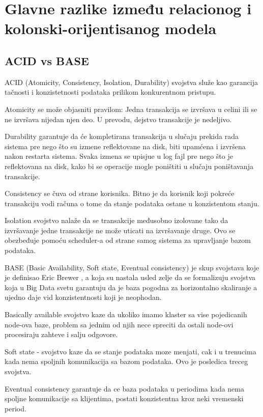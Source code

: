 \documentclass[12pt,oneside]{memoir}
\begin{document}
\pagebreak

\section{Glavne razlike između relacionog i kolonski-orijentisanog modela}

\subsection{ACID vs BASE}

ACID (Atomicity, Consistency, Isolation, Durability) svojstva služe kao garancija tačnosti i konzistetnosti podataka prilikom konkurentnom pristupu. 

Atomicity se može objasniti pravilom: Jedna transakcija se izvršava u celini ili se ne izvršava nijedan njen deo. U prevodu, dejstvo transakcije je nedeljivo. 

Durability garantuje da će kompletirana transakcija u slučaju prekida rada sistema pre nego što su izmene reflektovane na disk, biti upamćena i izvršena nakon restarta sistema. Svaka izmena se upisjue u log fajl pre nego što je reflektovana na disk, kako bi se operacije mogle poništiti u slučaju poništavanja transakcije.

Consistency se čuva od strane korisnika. Bitno je da korisnik koji pokreće transakciju vodi računa o tome da stanje podataka ostane u konzistentom stanju.

Isolation svojstvo nalaže da se transakcije međusobno izolovane tako da izvršavanje jedne transakcije ne može uticati na izvršavanje druge. Ovo se obezbeđuje pomoću scheduler-a od strane samog sistema za upravljanje bazom podataka.

BASE (Basic Availability, Soft state, Eventual consistency) je skup svojstava koje je definisao Eric Brewer , a koja su nastala usled zelje da se formalizuju svojstva koja u Big Data svetu garantuju da je baza pogodna za horizontalno skaliranje a ujedno daje vid konzistentnosti koji je neophodan. 

Basically available  svojstvo kaze da ukoliko imamo klaster sa vise pojedicanih node-ova baze, problem sa jednim od njih nece spreciti da ostali node-ovi procesiraju zahteve i salju odgovore.

Soft state -  svojstvo kaze da se stanje podataka moze menjati, cak i u trenucima kada nema spoljnih komunikacija sa bazom podataka. Ovo je posledica treceg svojstva.

Eventual consistency garantuje da ce baza podataka u periodima kada nema spoljne komunikacije sa klijentima, postati konzistentna kroz neki vremenski period. 
\end{document}
